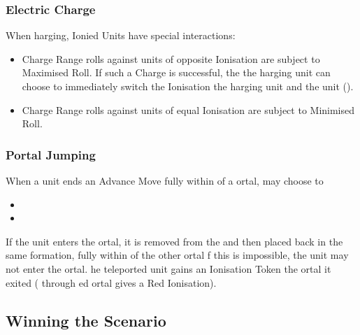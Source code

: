\subsubsection*{Electric Charge\titleruletype{\attackattribute}}

When harging, Ionied Units have special interactions:
\begin{itemize}%
	\item Charge Range rolls against units of opposite Ionisation are subject to Maximised Roll. If such a Charge is successful, the  the harging unit can choose to immediately switch the Ionisation  the harging unit and the  unit ().
	\item Charge Range rolls against units of equal Ionisation are subject to Minimised Roll.
\end{itemize}
	
\subsubsection*{Portal Jumping}

When a unit ends an Advance Move fully within  of a ortal,  may choose to 
\begin{itemize}
	\item {}
	\item {}
\end{itemize}

If the unit enters the ortal, it is removed from the  and then placed back in the same formation,  fully within  of the other ortal f this is impossible, the unit may not enter the ortal. he teleported unit  gains an Ionisation Token  the ortal it exited ( through ed ortal gives a Red Ionisation).

\subsection*{Winning the Scenario}

